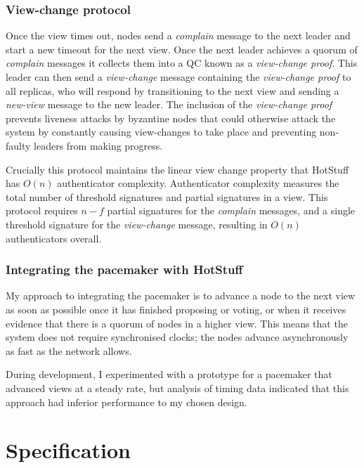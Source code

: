 \subsubsection{View-change protocol} \label{viewchange}

Once the view times out, nodes send a \textit{complain} message to the next leader and start a new timeout for the next view. Once the next leader achieves a quorum of \textit{complain} messages it collects them into a QC known as a \textit{view-change proof}. This leader can then send a \textit{view-change} message containing the \textit{view-change proof} to all replicas, who will respond by transitioning to the next view and sending a \textit{new-view} message to the new leader. The inclusion of the \textit{view-change proof} prevents liveness attacks by byzantine nodes that could otherwise attack the system by constantly causing view-changes to take place and preventing non-faulty leaders from making progress.

Crucially this protocol maintains the linear view change property that HotStuff has $O(n)$ authenticator complexity. Authenticator complexity measures the total number of threshold signatures and partial signatures in a view. This protocol requires $n - f$ partial signatures for the \textit{complain} messages, and a single threshold signature for the \textit{view-change} message, resulting in $O(n)$ authenticators overall.

\subsubsection{Integrating the pacemaker with HotStuff}

My approach to integrating the pacemaker is to advance a node to the next view as soon as possible once it has finished proposing or voting, or when it receives evidence that there is a quorum of nodes in a higher view. This means that the system does not require synchronised clocks; the nodes advance asynchronously as fast as the network allows.

During development, I experimented with a prototype for a pacemaker that advanced views at a steady rate, but analysis of timing data indicated that this approach had inferior performance to my chosen design.

\section{Specification} \label{spec}

